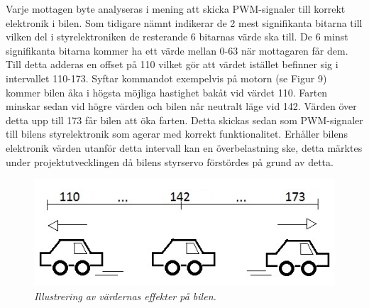 \documentclass[a4paper]{article}
\begin{document}
\vspace{5mm} \noindent
Varje mottagen byte analyseras i mening att skicka PWM-signaler till korrekt elektronik i bilen. Som tidigare nämnt indikerar de 2 mest signifikanta bitarna till vilken del i styrelektroniken de resterande 6 bitarnas värde ska till. De 6 minst signifikanta bitarna kommer ha ett värde mellan 0-63 när mottagaren får dem. Till detta adderas en offset på 110 vilket gör att värdet istället befinner sig i intervallet 110-173. Syftar kommandot exempelvis på motorn (se Figur 9) kommer bilen åka i högsta möjliga hastighet bakåt vid värdet 110. Farten minskar sedan vid högre värden och bilen når neutralt läge vid 142. Värden över detta upp till 173 får bilen att öka farten. Detta skickas sedan som PWM-signaler till bilens styrelektronik som agerar med korrekt funktionalitet. Erhåller bilens elektronik värden utanför detta intervall kan en överbelastning ske, detta märktes under projektutvecklingen då bilens styrservo förstördes på grund av detta.




\begin{figure}[H]
\includegraphics[scale=1]{110-173Car.jpg}
\centering
\caption{\it Illustrering av värdernas effekter på bilen.}
\end{figure}



\end{document}

